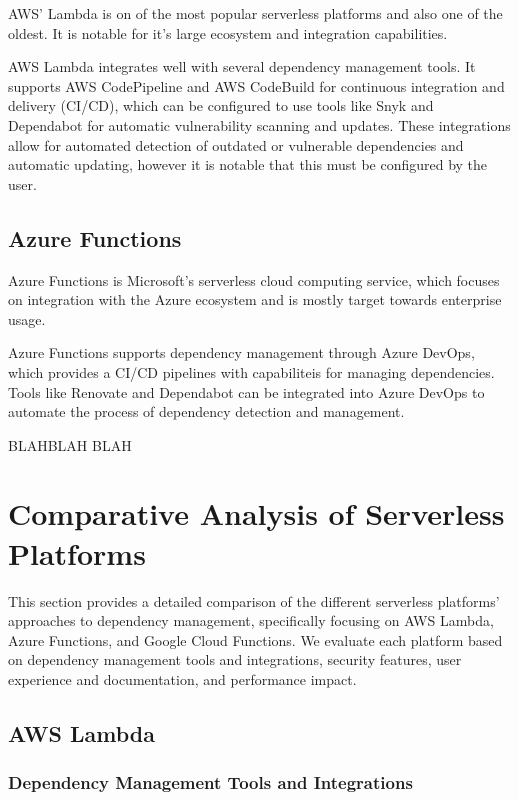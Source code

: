 \documentclass[sigconf]{acmart}
\begin{document}
AWS' Lambda is on of the most popular serverless platforms and also one of the oldest. It is notable for it's large ecosystem and integration capabilities.

AWS Lambda integrates well with several dependency management tools. It supports AWS CodePipeline and AWS CodeBuild for continuous integration and delivery (CI/CD), which can be configured to use tools like Snyk and Dependabot for automatic vulnerability scanning and updates. These integrations allow for automated detection of outdated or vulnerable dependencies and automatic updating, however it is notable that this must be configured by the user.

\subsection{Azure Functions}

Azure Functions is Microsoft's serverless cloud computing service, which focuses on integration with the Azure ecosystem and is mostly target towards enterprise usage. 

Azure Functions supports dependency management through Azure DevOps, which provides a CI/CD pipelines with capabiliteis for managing dependencies. Tools like Renovate and Dependabot can be integrated into Azure DevOps to automate the process of dependency detection and management. 

BLAHBLAH BLAH 

\section{Comparative Analysis of Serverless Platforms}

This section provides a detailed comparison of the different serverless platforms' approaches to dependency management, specifically focusing on AWS Lambda, Azure Functions, and Google Cloud Functions. We evaluate each platform based on dependency management tools and integrations, security features, user experience and documentation, and performance impact.

\subsection{AWS Lambda}

\subsubsection{Dependency Management Tools and Integrations}
\end{document}
